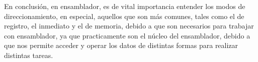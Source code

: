 	En conclusión, en ensamblador, es de vital importancia entender los modos de
	direccionamiento, en especial, aquellos que son más comunes, tales como el
	de registro, el inmediato y el de memoria, debido a que son necesarios para
	trabajar con ensamblador, ya que practicamente son el núcleo del
	ensamblador, debido a que nos permite acceder y operar los datos de
	distintas formas para realizar distintas tareas.


	\nocite{*} %

	\clearpage
	

	

